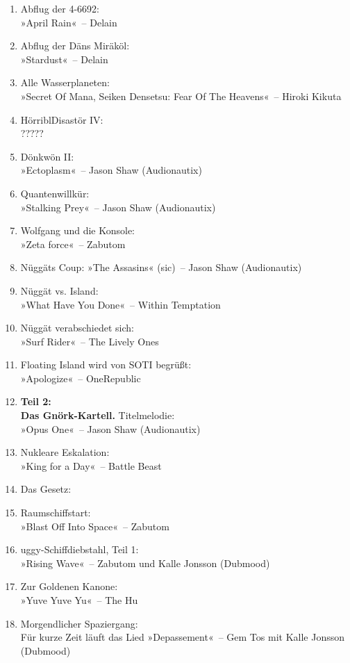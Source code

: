 \begin{enumerate}
    \item Abflug der 4-6692:\\ »April Rain«~– Delain
    \item Abflug der Däns Miräköl:\\ »Stardust«~– Delain
    \item Alle Wasserplaneten:\\ »Secret Of Mana, Seiken Densetsu: Fear Of The Heavens«~– Hiroki Kikuta
    \item HörriblDisastör IV:\\ ?????
    \item Dönkwön II:\\ »Ectoplasm«~– Jason Shaw (Audionautix)
    \item Quantenwillkür:\\ »Stalking Prey«~– Jason Shaw (Audionautix)
    \item Wolfgang und die Konsole:\\ »Zeta force«~– Zabutom
    \item Nüggäts Coup: »The Assasins« (sic)~– Jason Shaw (Audionautix)
    \item Nüggät vs. Island:\\ »What Have You Done«~– Within Temptation
    \item Nüggät verabschiedet sich:\\ »Surf Rider«~– The Lively Ones
    \item Floating Island wird von SOTI begrüßt:\\ »Apologize«~– OneRepublic
    \item \textbf{Teil 2:\\ Das Gnörk-Kartell.} Titelmelodie:\\ »Opus One«~– Jason Shaw (Audionautix)
    \item Nukleare Eskalation:\\ »King for a Day«~– Battle Beast
    \item Das Gesetz:
    \item Raumschiffstart:\\ »Blast Off Into Space«~– Zabutom
    \item uggy-Schiffdiebstahl, Teil 1:\\ »Rising Wave«~– Zabutom und Kalle Jonsson (Dubmood)
    \item Zur Goldenen Kanone:\\ »Yuve Yuve Yu«~– The Hu
    \item Morgendlicher Spaziergang:\\ Für kurze Zeit läuft das Lied »Depassement«~– Gem Tos mit Kalle Jonsson (Dubmood)

\end{enumerate}
